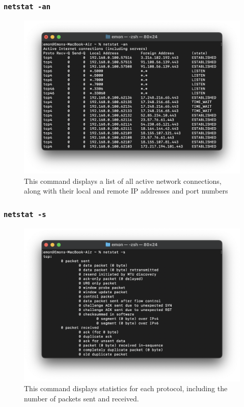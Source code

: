 \documentclass[11pt]{article}
\newcommand{\terminal}[1]{\texttt{\color{terminalcolor}#1}}
\begin{document}
\subsubsection{\terminal{netstat -an}}
\begin{figure}[!h]
    \centering
    \includegraphics[width=\textwidth]{netstat1.png}
    \caption{This command displays a list of all active network connections, along with their local and remote IP addresses and port numbers}
\end{figure}

\newpage

\subsubsection{\terminal{netstat -s}}
\begin{figure}[!h]
    \centering
    \includegraphics[width=\textwidth]{netstat2.png}
    \caption{This command displays statistics for each protocol, including the number of packets sent and received.}
\end{figure}
\end{document}
